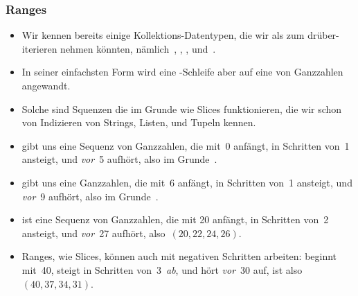 \documentclass[aspectratio=169,mathserif,notheorems]{beamer}%
\begin{document}
\begin{frame}%
\frametitle{Ranges}%
\begin{itemize}%
\item Wir kennen bereits einige Kollektions-Datentypen, die wir als  zum drüber-iterieren nehmen könnten, nämlich~, , , und~.%
%
\item<2-> In seiner einfachsten Form wird eine -Schleife aber auf eine  von Ganzzahlen angewandt.%
%
\item<3-> Solche  sind Squenzen die im Grunde wie Slices funktionieren, die wir schon von Indizieren von Strings, Listen, und Tupeln kennen.%
%
\item<4->  gibt uns eine Sequenz von Ganzzahlen, die mit~0 anfängt, in Schritten von~1 ansteigt, und \emph{vor}~5 aufhört, also im Grunde~.%
%
\item<5->  gibt uns eine Ganzzahlen, die mit~6 anfängt, in Schritten von~1 ansteigt, und \emph{vor}~9 aufhört, also im Grunde~.%
%
\item<6->  ist eine Sequenz von Ganzzahlen, die mit 20 anfängt, in Schritten von~2 ansteigt, und \emph{vor}~27 aufhört, also~$(20, 22, 24, 26)$.%
%
\item<7-> Ranges, wie Slices, können auch mit negativen Schritten arbeiten:  beginnt mit~40, steigt in Schritten von~3~\emph{ab}, und hört \emph{vor}~30 auf, ist also~$(40, 37, 34, 31)$.%
\end{itemize}%
\end{frame}%
%
%
\end{document}
